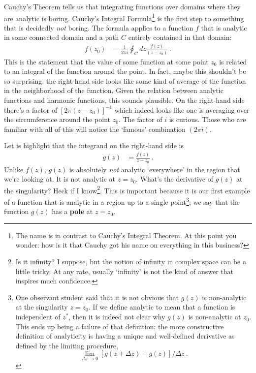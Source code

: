 \documentclass[
  11pt,
	colorful,
	raggedright,
]{tufte-style-thesis-flip}
\begin{document}
Cauchy's Theorem tells us that integrating functions over domains where they are analytic is boring. Cauchy's Integral Formula\footnote{The name is in contrast to Cauchy's Integral Theorem. At this point you wonder: how is it that Cauchy got his name on everything in this business?} is the first step to something that is decidedly \emph{not} boring. The formula applies to a function $f$ that is analytic in some connected domain and a path $C$ entirely contained in that domain:
\begin{align}
  f(z_0) &= \frac{1}{2\pi i} \oint_C dz \frac{f(z)}{(z-z_0)}  \ .
  \label{eq:cauchy:integral}
\end{align}
This is the statement that the value of some function at some point $z_0$ is related to an integral of the function around the point. In fact, maybe this shouldn't be so surprising: the right-hand side looks like some kind of average of the function in the neighborhood of the function. Given the relation between analytic functions and harmonic functions, this sounds plausible. On the right-hand side there's a factor of $[2\pi (z-z_0)]^{-1}$ which indeed looks like one is averaging over the circumference around the point $z_0$. The factor of $i$ is curious. Those who are familiar with all of this will notice the `famous' combination $(2\pi i)$.

Let is highlight that the integrand on the right-hand side is 
\begin{align}
  g(z) &= \frac{f(z)}{z-z_0} \ .
  \label{eq:g:z:cauchy:integral:theorem}
\end{align}
Unlike $f(z)$, $g(z)$ is absolutely \emph{not} analytic `everywhere' in the region that we're looking at. It is not analytic at $z=z_0$. What's the derivative of $g(z)$ at the singularity? Heck if I know\footnote{Is it infinity? I suppose, but the notion of infinity in complex space can be a little tricky. At any rate, usually `infinity' is not the kind of answer that inspires much confidence.}. This is important because it is our first example of a function that is analytic in a region up to a single point\footnote{%
%
One observant student said that it is not obvious that $g(z)$ is non-analytic at the singularity $z=z_0$. If we define analytic to mean that a function is independent of $z^*$, then it is indeed not clear why $g(z)$ is non-analytic at $z_0$. This ends up being a failure of that definition: the more constructive definition of analyticity is having a unique and well-defined derivative as defined by the limiting procedure, $$\lim_{\Delta z\to 0}[g(z+\Delta z)-g(z)]/\Delta z \ .$$ 
%
}; we say that the function $g(z)$ has a \textbf{pole} at $z=z_0$.
\end{document}
